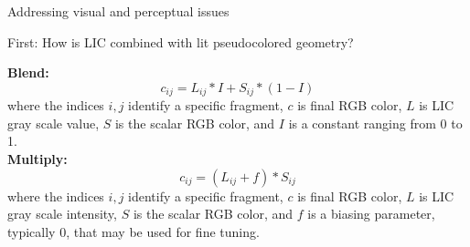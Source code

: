 \documentclass[notes]{beamer}
\begin{document}
\begin{frame}{Addressing visual and perceptual issues}
    \begin{beamerboxesrounded}{First: How is LIC combined with lit pseudocolored geometry?}
    \begin{minipage}{0.5\linewidth}
    {\bf \footnotesize Blend:} \\
    \vspace{-0.1in}
    {\scriptsize
    \begin{equation}
    c_{ij} = L_{ij} * I + S_{ij} * (1 - I)
    \end{equation}
    where the indices $i,j$ identify a specific fragment, $c$ is final RGB color, $L$ is LIC gray scale value, $S$ is the scalar RGB color, and $I$ is a constant ranging from 0 to 1. } \vspace{0.1in} \\
    {\bf \footnotesize Multiply:} \\
    \vspace{-0.1in}
    {\scriptsize
    \begin{equation}
        c_{ij} = ( L_{ij} + f ) * S_{ij}
    \end{equation}
    where the indices $i,j$ identify a specific fragment, $c$ is final RGB color, $L$ is LIC gray scale intensity, $S$ is the scalar RGB color, and $f$ is a biasing parameter, typically 0, that may be used for fine tuning.} \vspace{0.1in} \\
    {\scriptsize
    \begin{equation*}
    \end{equation*}}
    \end{minipage}\hspace{0.025in}
    \begin{minipage}{0.45\linewidth}
    \begin{center}

\end{center}
\end{minipage}
\end{beamerboxesrounded}
\end{frame}
\end{document}
